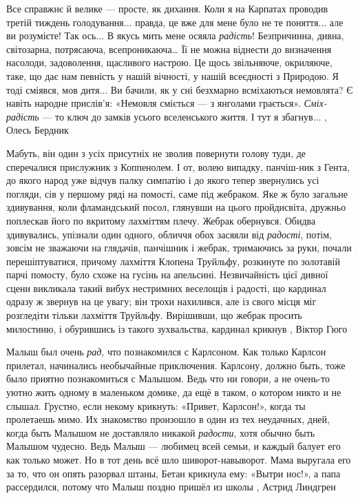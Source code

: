Все справжнє й велике — просте, як дихання. Коли я на Карпатах проводив третій
тиждень голодування... правда, це вже для мене було не те поняття... але ви
розумієте! Так ось... В якусь мить мене осяяла \emph{радість}! Безпричинна,
дивна, світозарна, потрясаюча, всепроникаюча… Її не можна віднести до
визначення насолоди, задоволення, щасливого настрою. Це щось звільняюче,
окриляюче, таке, що дає нам певність у нашій вічності, у нашій всеєдності з
Природою. Я тоді сміявся, мов дитя... Ви бачили, як у сні безхмарно всміхаються
немовлята? Є навіть народне прислів’я: «Немовля сміється — з янголами
грається».  \emph{Сміх-радість} — то ключ до замків усього вселенського життя.
І тут я збагнув...
, Олесь Бердник

Мабуть, він один з усіх присутніх не зволив повернути голову туди, де
сперечалися прислужник з Коппенолем. І от, волею випадку, панчіш-ник з Гента,
до якого народ уже відчув палку симпатію і до якого тепер звернулись усі
погляди, сів у першому ряді на помості, саме під жебраком. Яке ж було загальне
здивування, коли фламандський посол, глянувши на цього пройдисвіта, дружньо
поплескав його по вкритому лахміттям плечу. Жебрак обернувся. Обидва
здивувались, упізнали один одного, обличчя обох засяяли від \emph{радості}, потім,
зовсім не зважаючи на глядачів, панчішник і жебрак, тримаючись за руки, почали
перешіптуватися, причому лахміття Клопена Труйльфу, розкинуте по золотавій
парчі помосту, було схоже на гусінь на апельсині.
Незвичайність цієї дивної сцени викликала такий вибух нестримних веселощів і
радості, що кардинал одразу ж звернув на це увагу; він трохи нахилився, але із
свого місця міг розгледіти тільки лахміття Труйльфу. Вирішивши, що жебрак
просить милостиню, і обурившись із такого зухвальства, кардинал крикнув
, Віктор Гюго

Малыш был очень \emph{рад}, что познакомился с Карлсоном. Как только Карлсон прилетал,
начинались необычайные приключения. Карлсону, должно быть, тоже было приятно
познакомиться с Малышом. Ведь что ни говори, а не очень-то уютно жить одному в
маленьком домике, да ещё в таком, о котором никто и не слышал. Грустно, если
некому крикнуть: «Привет, Карлсон!», когда ты пролетаешь мимо.
Их знакомство произошло в один из тех неудачных, дней, когда быть Малышом не
доставляло никакой \emph{радости}, хотя обычно быть Малышом чудесно. Ведь Малыш —
любимец всей семьи, и каждый балует его как только может. Но в тот день всё шло
шиворот-навыворот. Мама выругала его за то, что он опять разорвал штаны, Бетан
крикнула ему: «Вытри нос!», а папа рассердился, потому что Малыш поздно пришёл
из школы
, Астрид Линдгрен

